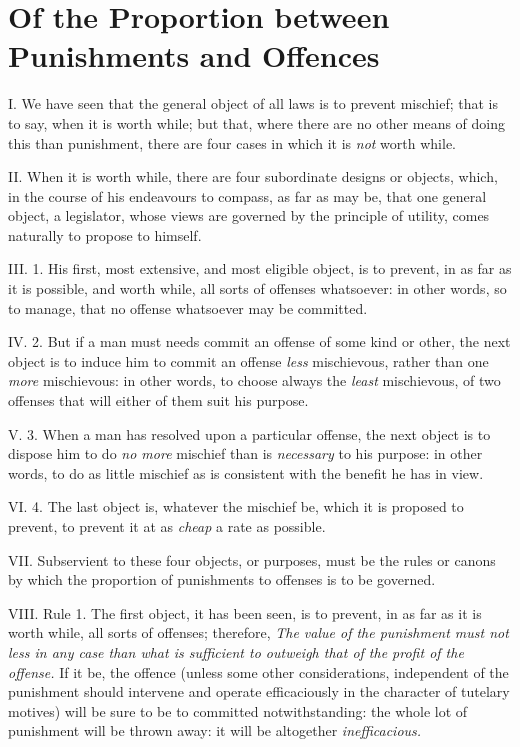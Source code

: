 \documentclass[12pt]{report}
\begin{document}
\chapter{Of the Proportion between Punishments and Offences}

I. We have seen that the general object of all laws is to prevent
mischief; that is to say, when it is worth while; but that, where there
are no other means of doing this than punishment, there are four cases
in which it is \emph{not} worth while.

II. When it is worth while, there are four subordinate designs or
objects, which, in the course of his endeavours to compass, as far as
may be, that one general object, a legislator, whose views are governed
by the principle of utility, comes naturally to propose to himself.

III. 1. His first, most extensive, and most eligible object, is to
prevent, in as far as it is possible, and worth while, all sorts of
offenses whatsoever: in other words, so to manage, that no offense
whatsoever may be committed.

IV. 2. But if a man must needs commit an offense of some kind or other,
the next object is to induce him to commit an offense \emph{less}
mischievous, rather than one \emph{more} mischievous: in other words, to
choose always the \emph{least} mischievous, of two offenses that will
either of them suit his purpose.

V. 3. When a man has resolved upon a particular offense, the next object
is to dispose him to do \emph{no more} mischief than is \emph{necessary}
to his purpose: in other words, to do as little mischief as is
consistent with the benefit he has in view.

VI. 4. The last object is, whatever the mischief be, which it is
proposed to prevent, to prevent it at as \emph{cheap} a rate as
possible.

VII. Subservient to these four objects, or purposes, must be the rules
or canons by which the proportion of punishments to offenses is to be
governed.

VIII. Rule 1. The first object, it has been seen, is to prevent, in as
far as it is worth while, all sorts of offenses; therefore, \emph{The
value of the punishment must not less in any case than what is
sufficient to outweigh that of the profit of the offense.} If it be, the
offence (unless some other considerations, independent of the punishment
should intervene and operate efficaciously in the character of tutelary
motives) will be sure to be to committed notwithstanding: the whole lot
of punishment will be thrown away: it will be altogether
\emph{inefficacious.}
\end{document}
